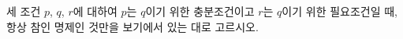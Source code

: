 세 조건 $p$, $q$, $r$에 대하여 $p$는 $q$이기 위한 충분조건이고 $r$는 $q$이기 위한 필요조건일 때, 항상 참인 명제인 것만을 보기에서 있는 대로 고르시오. 
